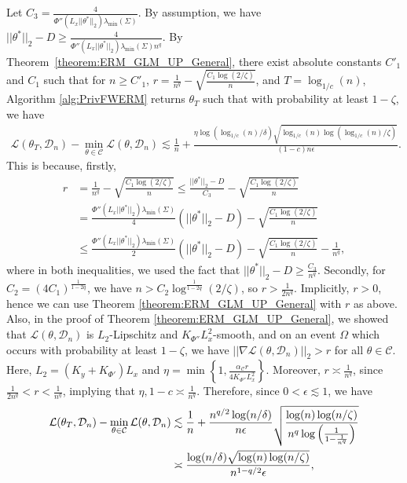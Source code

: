 \documentclass{article}
\begin{document}
Let $C_3 = \frac{4}{\Phi''(L_x||\theta^*||_2)\lambda_{\min}(\Sigma)}$. By assumption, we have $||\theta^*||_2 - D \geq \frac{4}{\Phi''(L_x||\theta^*||_2)\lambda_{\min}(\Sigma)n^q}$. By Theorem~\ref{theorem:ERM_GLM_UP_General}, there exist absolute constants $C'_1$ and $C_1$ such that for $n \geq C'_1$, $r = \frac{1}{n^q} - \sqrt{\frac{C_1\log(2/\zeta)}{n}}$, and $T = \log_{1/c}(n)$, Algorithm \ref{alg:PrivFWERM} returns $\theta_T$ such that with probability at least $1 - \zeta$, we have
\begin{align*}
\mathcal{L}(\theta_T, \mathcal{D}_n) - \mathop{\min}\limits_{\theta \in \mathcal{C}}\mathcal{L}(\theta, \mathcal{D}_n) \lesssim \frac{1}{n} + \frac{\eta\log\left(\log_{1/c}(n)/\delta\right)\sqrt{\log_{1/c}(n)\log\left(\log_{1/c}(n)/\zeta\right)}}{(1 - c)n\epsilon}.
\end{align*}
This is because, firstly,
\begin{align*}
r &= \frac{1}{n^q} - \sqrt{\frac{C_1\log(2/\zeta)}{n}} \leq \frac{||\theta^*||_2 - D}{C_3} - \sqrt{\frac{C_1\log(2/\zeta)}{n}}\\
&= \frac{\Phi''(L_x||\theta^*||_2)\lambda_{\min}(\Sigma)}{4}(||\theta^*||_2 - D) - \sqrt{\frac{C_1\log(2/\zeta)}{n}}\\
&\leq \frac{\Phi''(L_x||\theta^*||_2)\lambda_{\min}(\Sigma)}{2}(||\theta^*||_2 - D) - \sqrt{\frac{C_1\log(2/\zeta)}{n}} - \frac{1}{n^q},
\end{align*}
where in both inequalities, we used the fact that $||\theta^*||_2 - D \geq \frac{C_3}{n^q}$. Secondly, for $C_2 = (4C_1)^{\frac{1}{1 - 2q}}$, we have $n > C_2\log^{\frac{1}{1 - 2q}}(2/\zeta)$, so $r > \frac{1}{2n^q}$. Implicitly, $r > 0$, hence we can use Theorem \ref{theorem:ERM_GLM_UP_General} with $r$ as above. Also, in the proof of Theorem \ref{theorem:ERM_GLM_UP_General}, we showed that $\mathcal{L}(\theta, \mathcal{D}_n)$ is $L_2$-Lipschitz and $K_{\Phi''}L_x^2$-smooth, and on an event $\Omega$ which occurs with probability at least $1 - \zeta$, we have $||\nabla \mathcal{L}(\theta, \mathcal{D}_n)||_2 > r$ for all $\theta \in \mathcal{C}$. Here, $L_2 = (K_y + K_{\Phi'})L_x$ and $\eta = \min\left\{1, \frac{\alpha_{\mathcal{C}}r}{4K_{\Phi''}L_x^2}\right\}$. Moreover, $r \asymp \frac{1}{n^q}$, since $\frac{1}{2n^q} < r < \frac{1}{n^q}$, implying that $\eta, 1 - c \asymp \frac{1}{n^q}$. Therefore, since $0 < \epsilon \lesssim 1$, we have
\begin{align}
\label{eq:Inc_C_intermed}
\mathcal{L}(\theta_T, \mathcal{D}_n) - \mathop{\min}\limits_{\theta \in \mathcal{C}}\mathcal{L}(\theta, \mathcal{D}_n) &\lesssim \frac{1}{n} + \frac{n^{q/2}\log(n/\delta)}{n\epsilon}\sqrt{\frac{\log(n)\log(n/\zeta)}{n^q\log\left(\frac{1}{1 - \frac{1}{n^q}}\right)}} \notag\\
&\asymp \frac{\log(n/\delta)\sqrt{\log(n)\log(n/\zeta)}}{n^{1 - q/2}\epsilon},
\end{align}
\end{document}
